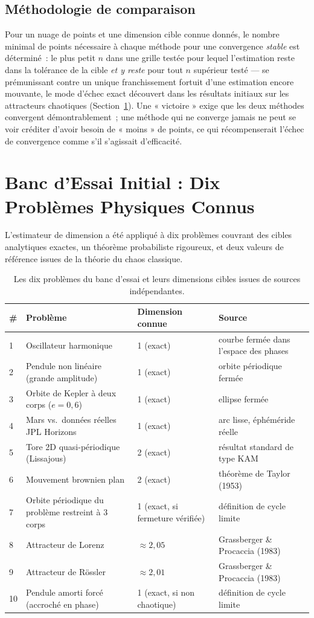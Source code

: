 \documentclass[11pt,a4paper]{article}
\begin{document}
\subsection{Méthodologie de comparaison}

Pour un nuage de points et une dimension cible connue donnés, le nombre
minimal de points nécessaire à chaque méthode pour une convergence
\emph{stable} est déterminé~: le plus petit $n$ dans une grille testée pour
lequel l'estimation reste dans la tolérance de la cible \emph{et y reste}
pour tout $n$ supérieur testé --- se prémunissant contre un unique
franchissement fortuit d'une estimation encore mouvante, le mode d'échec
exact découvert dans les résultats initiaux sur les attracteurs chaotiques
(Section~\ref{sec:resultats}). Une « victoire » exige que les deux
méthodes convergent démontrablement~; une méthode qui ne converge jamais
ne peut se voir créditer d'avoir besoin de « moins » de points, ce qui
récompenserait l'échec de convergence comme s'il s'agissait d'efficacité.

\section{Banc d'Essai Initial : Dix Problèmes Physiques Connus}
\label{sec:resultats}

L'estimateur de dimension a été appliqué à dix problèmes couvrant des
cibles analytiques exactes, un théorème probabiliste rigoureux, et deux
valeurs de référence issues de la théorie du chaos classique.

\begin{table}[h]
\centering
\small
\begin{tabular}{@{}llll@{}}
\toprule
\# & Problème & Dimension connue & Source \\
\midrule
1 & Oscillateur harmonique & 1 (exact) & courbe fermée dans l'espace des phases \\
2 & Pendule non linéaire (grande amplitude) & 1 (exact) & orbite périodique fermée \\
3 & Orbite de Kepler à deux corps ($e=0,6$) & 1 (exact) & ellipse fermée \\
4 & Mars vs.\ données réelles JPL Horizons & 1 (exact) & arc lisse, éphéméride réelle \\
5 & Tore 2D quasi-périodique (Lissajous) & 2 (exact) & résultat standard de type KAM \\
6 & Mouvement brownien plan & 2 (exact) & théorème de Taylor (1953) \\
7 & Orbite périodique du problème restreint à 3 corps & 1 (exact, si fermeture vérifiée) & définition de cycle limite \\
8 & Attracteur de Lorenz & $\approx 2,05$ & Grassberger \& Procaccia (1983) \\
9 & Attracteur de R\"ossler & $\approx 2,01$ & Grassberger \& Procaccia (1983) \\
10 & Pendule amorti forcé (accroché en phase) & 1 (exact, si non chaotique) & définition de cycle limite \\
\bottomrule
\end{tabular}
\caption{Les dix problèmes du banc d'essai et leurs dimensions cibles issues de sources indépendantes.}
\end{table}
\end{document}
